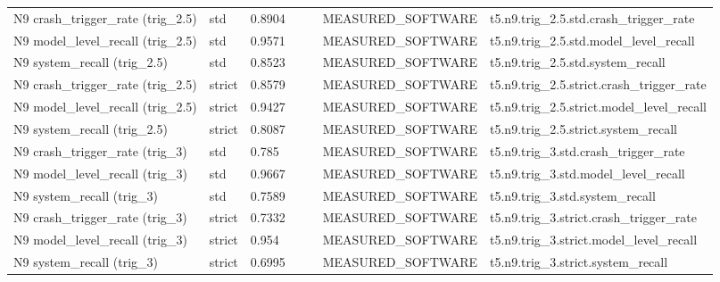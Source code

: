 \begin{table}[t]
\begin{tabular}{lllllll}
N9 crash\_trigger\_rate (trig\_2.5) & std & 0.8904 &  &  & MEASURED\_SOFTWARE & t5.n9.trig\_2.5.std.crash\_trigger\_rate \\
N9 model\_level\_recall (trig\_2.5) & std & 0.9571 &  &  & MEASURED\_SOFTWARE & t5.n9.trig\_2.5.std.model\_level\_recall \\
N9 system\_recall (trig\_2.5) & std & 0.8523 &  &  & MEASURED\_SOFTWARE & t5.n9.trig\_2.5.std.system\_recall \\
N9 crash\_trigger\_rate (trig\_2.5) & strict & 0.8579 &  &  & MEASURED\_SOFTWARE & t5.n9.trig\_2.5.strict.crash\_trigger\_rate \\
N9 model\_level\_recall (trig\_2.5) & strict & 0.9427 &  &  & MEASURED\_SOFTWARE & t5.n9.trig\_2.5.strict.model\_level\_recall \\
N9 system\_recall (trig\_2.5) & strict & 0.8087 &  &  & MEASURED\_SOFTWARE & t5.n9.trig\_2.5.strict.system\_recall \\
N9 crash\_trigger\_rate (trig\_3) & std & 0.785 &  &  & MEASURED\_SOFTWARE & t5.n9.trig\_3.std.crash\_trigger\_rate \\
N9 model\_level\_recall (trig\_3) & std & 0.9667 &  &  & MEASURED\_SOFTWARE & t5.n9.trig\_3.std.model\_level\_recall \\
N9 system\_recall (trig\_3) & std & 0.7589 &  &  & MEASURED\_SOFTWARE & t5.n9.trig\_3.std.system\_recall \\
N9 crash\_trigger\_rate (trig\_3) & strict & 0.7332 &  &  & MEASURED\_SOFTWARE & t5.n9.trig\_3.strict.crash\_trigger\_rate \\
N9 model\_level\_recall (trig\_3) & strict & 0.954 &  &  & MEASURED\_SOFTWARE & t5.n9.trig\_3.strict.model\_level\_recall \\
N9 system\_recall (trig\_3) & strict & 0.6995 &  &  & MEASURED\_SOFTWARE & t5.n9.trig\_3.strict.system\_recall \\
\bottomrule
\end{tabular}
\end{table}
